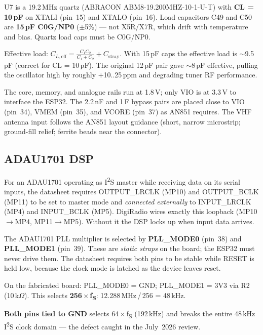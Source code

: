 \begin{drnote}
U7 is a 19.2\,MHz quartz (ABRACON ABM8-19.200MHZ-10-1-U-T) with
\textbf{CL = 10\,pF} on XTALI (pin~15) and XTALO (pin~16). Load capacitors
C49 and C50 are \textbf{15\,pF C0G/NP0} ($\pm$5\%) --- not X5R/X7R, which
drift with temperature and bias. Quartz load caps must be C0G/NP0.

Effective load: \(C_{L,\mathrm{eff}} = \frac{C_1 C_2}{C_1 + C_2} + C_{\mathrm{stray}}\).
With 15\,pF caps the effective load is $\sim$9.5\,pF (correct for CL = 10\,pF).
The original 12\,pF pair gave $\sim$8\,pF effective, pulling the oscillator
high by roughly +10..25\,ppm and degrading tuner RF performance.
\end{drnote}

The core, memory, and analogue rails run at 1.8\,V; only VIO is at 3.3\,V
to interface the ESP32. The 2.2\,nF and 1\,\textmu F bypass pairs are
placed close to VIO (pin~34), VMEM (pin~35), and VCORE (pin~37) as AN851
requires. The VHF antenna input follows the AN851 layout guidance (short,
narrow microstrip; ground-fill relief; ferrite beads near the connector).

\subsection{ADAU1701 DSP}
\label{sec:hw-val-adau}

\begin{drkey}
For an ADAU1701 operating as I\textsuperscript{2}S master while receiving
data on its serial inputs, the datasheet requires OUTPUT\_LRCLK (MP10) and
OUTPUT\_BCLK (MP11) to be set to master mode and \emph{connected externally}
to INPUT\_LRCLK (MP4) and INPUT\_BCLK (MP5). DigiRadio wires exactly this
loopback (MP10$\rightarrow$MP4, MP11$\rightarrow$MP5). Without it the DSP
locks up when input data arrives.
\end{drkey}

\begin{drcaution}
The ADAU1701 PLL multiplier is selected by \textbf{PLL\_MODE0} (pin~38) and
\textbf{PLL\_MODE1} (pin~39). These are \emph{static straps} on the board;
the ESP32 must never drive them. The datasheet requires both pins to be
stable while RESET is held low, because the clock mode is latched as the
device leaves reset.

On the fabricated board: PLL\_MODE0 = GND; PLL\_MODE1 = 3V3 via R2
(10\,k\(\Omega\)). This selects \textbf{256\,$\times$\,f\textsubscript{S}}:
12.288\,MHz\,/\,256 = 48\,kHz.

\textbf{Both pins tied to GND} selects 64\,$\times$\,f\textsubscript{S}
(192\,kHz) and breaks the entire 48\,kHz I\textsuperscript{2}S clock domain
--- the defect caught in the July~2026 review.
\end{drcaution}

